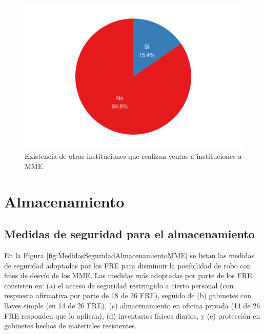 \documentclass[
]{book}
\begin{document}
\begin{figure}
\includegraphics[width=0.85\linewidth]{InformeFinal_files/figure-latex/InstitucionesAdicionales-1} \caption{Existencia de otras instituciones que realizan ventas a instituciones a MME}\label{fig:InstitucionesAdicionales}
\end{figure}

\hypertarget{almacenamiento}{%
\section{Almacenamiento}\label{almacenamiento}}

\hypertarget{medidas-de-seguridad-para-el-almacenamiento}{%
\subsection{Medidas de seguridad para el almacenamiento}\label{medidas-de-seguridad-para-el-almacenamiento}}


En la Figura \ref{fig:MedidasSeguridadAlmacenamientoMME} se listan las medidas de seguridad adoptadas por los FRE para disminuir la posibilidad de robo con fines de desvío de los MME. Las medidas más adoptadas por parte de los FRE consisten en: (a) el acceso de seguridad restringido a cierto personal (con respuesta afirmativa por parte de 18 de 26 FRE), seguido de (b) gabinetes con llaves simple (en 14 de 26 FRE), (c) almacenamiento en oficina privada (14 de 26 FRE responden que lo aplican), (d) inventarios físicos diarios, y (e) protección en gabinetes hechos de materiales resistentes.
\end{document}
